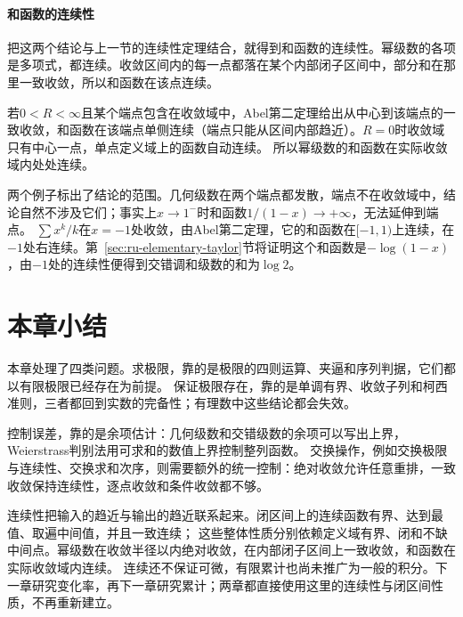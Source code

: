 \paragraph{和函数的连续性}
把这两个结论与上一节的连续性定理结合，就得到和函数的连续性。幂级数的各项是多项式，都连续。收敛区间内的每一点都落在某个内部闭子区间中，部分和在那里一致收敛，所以和函数在该点连续。

若$0<R<\infty$且某个端点包含在收敛域中，Abel第二定理给出从中心到该端点的一致收敛，和函数在该端点单侧连续（端点只能从区间内部趋近）。$R=0$时收敛域只有中心一点，单点定义域上的函数自动连续。
所以幂级数的和函数在实际收敛域内处处连续。

两个例子标出了结论的范围。几何级数在两个端点都发散，端点不在收敛域中，结论自然不涉及它们；事实上$x\to1^-$时和函数$1/(1-x)\to+\infty$，无法延伸到端点。
$\sum x^k/k$在$x=-1$处收敛，由Abel第二定理，它的和函数在$[-1,1)$上连续，在$-1$处右连续。第~\ref{sec:ru-elementary-taylor}节将证明这个和函数是$-\log(1-x)$，由$-1$处的连续性便得到交错调和级数的和为$\log2$。

\FloatBarrier
\section{本章小结}
\label{sec:function-limits-summary}

本章处理了四类问题。求极限，靠的是极限的四则运算、夹逼和序列判据，它们都以有限极限已经存在为前提。
保证极限存在，靠的是单调有界、收敛子列和柯西准则，三者都回到实数的完备性；有理数中这些结论都会失效。

控制误差，靠的是余项估计：几何级数和交错级数的余项可以写出上界，Weierstrass判别法用可求和的数值上界控制整列函数。
交换操作，例如交换极限与连续性、交换求和次序，则需要额外的统一控制：绝对收敛允许任意重排，一致收敛保持连续性，逐点收敛和条件收敛都不够。

连续性把输入的趋近与输出的趋近联系起来。闭区间上的连续函数有界、达到最值、取遍中间值，并且一致连续；
这些整体性质分别依赖定义域有界、闭和不缺中间点。幂级数在收敛半径以内绝对收敛，在内部闭子区间上一致收敛，和函数在实际收敛域内连续。
连续还不保证可微，有限累计也尚未推广为一般的积分。下一章研究变化率，再下一章研究累计；两章都直接使用这里的连续性与闭区间性质，不再重新建立。
